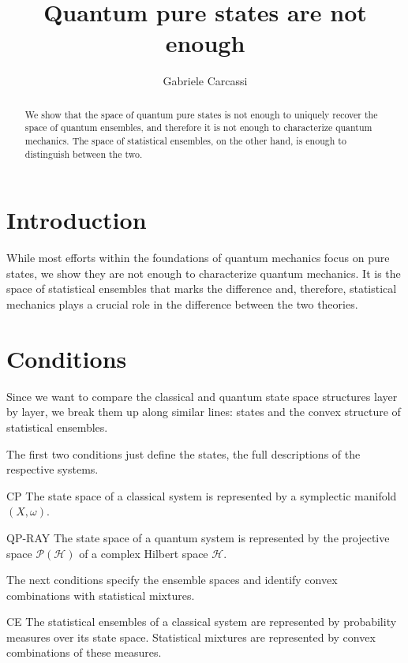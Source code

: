 \documentclass{techbrief}
\title{Quantum pure states are not enough}
\author{Gabriele Carcassi}
\begin{document}
	
\maketitle
	
\begin{abstract}
	We show that the space of quantum pure states is not enough to uniquely recover the space of quantum ensembles, and therefore it is not enough to characterize quantum mechanics. The space of statistical ensembles, on the other hand, is enough to distinguish between the two.
\end{abstract}

\section{Introduction}

While most efforts within the foundations of quantum mechanics focus on pure states, we show they are not enough to characterize quantum mechanics. It is the space of statistical ensembles that marks the difference and, therefore, statistical mechanics plays a crucial role in the difference between the two theories.

\section{Conditions}

Since we want to compare the classical and quantum state space structures layer by layer, we break them up along similar lines: states and the convex structure of statistical ensembles.

The first two conditions just define the states, the full descriptions of the respective systems.

\begin{condition}{CP}
	The state space of a classical system is represented by a symplectic manifold $(X,\omega)$.
\end{condition}

\begin{condition}{QP-RAY}
	The state space of a quantum system is represented by the projective space $\mathcal{P}(\mathcal{H})$ of a complex Hilbert space $\mathcal{H}$.
\end{condition}

The next conditions specify the ensemble spaces and identify convex combinations with statistical mixtures.

\begin{condition}{CE}
	The statistical ensembles of a classical system are represented by probability measures over its state space. Statistical mixtures are represented by convex combinations of these measures.
\end{condition}
\end{document}
